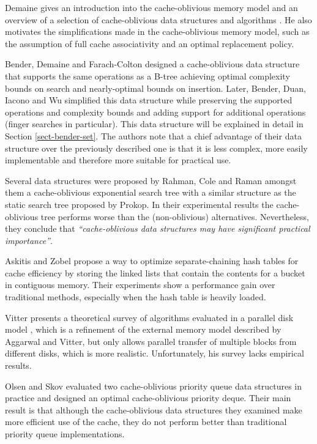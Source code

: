 \documentclass{acm_proc_article-sp}
\begin{document}
Demaine gives an introduction into the cache-oblivious memory model and an overview of a selection of cache-oblivious data structures and algorithms \cite{demaine2002coa}. He also motivates the simplifications made in the cache-oblivious memory model, such as the assumption of full cache associativity and an optimal replacement policy.

Bender, Demaine and Farach-Colton designed a cache-oblivious data structure that supports the same operations as a B-tree \cite{bender2005cob} achieving optimal complexity bounds on search and nearly-optimal bounds on insertion.
Later, Bender, Duan, Iacono and Wu simplified this data structure \cite{bender2004lpc} while preserving the supported operations and complexity bounds and adding support for additional operations (finger searches in particular).
This data structure will be explained in detail in Section \ref{sect-bender-set}.
The authors note that a chief advantage of their data structure over the
previously described one is that it is less complex, more easily implementable
and therefore more suitable for practical use.

Several data structures were proposed by Rahman, Cole and Raman \cite{rahman2001opd} amongst them a cache-oblivious exponential search tree with a similar structure as the static search tree proposed by Prokop. In their experimental results the cache-oblivious tree performs worse than the (non-oblivious) alternatives. Nevertheless, they conclude that \textit{``cache-obli\-vious data structures may have significant practical importance''}.

Askitis and Zobel \cite{askitis2005ccc} propose a way to optimize
separate-chaining hash tables for cache efficiency by storing the linked lists
that contain the contents for a bucket in contiguous memory. Their experiments
show a performance gain over traditional methods, especially when the hash table
is heavily loaded.

Vitter presents a theoretical survey of algorithms evaluated in a parallel disk model \cite{vitter2001ema}, which is a refinement of the external memory model described by Aggarwal and Vitter, but only allows parallel transfer of multiple blocks from different disks, which is more realistic. Unfortunately, his survey lacks empirical results.

Olsen and Skov evaluated two cache-oblivious priority queue data structures in practice \cite{olsen2002coa} and designed an optimal cache-obli\-vious priority deque. Their main result is that although the cache-obli\-vious data structures they examined make more efficient use of the cache, they do not perform better than traditional priority queue implementations.
\end{document}
